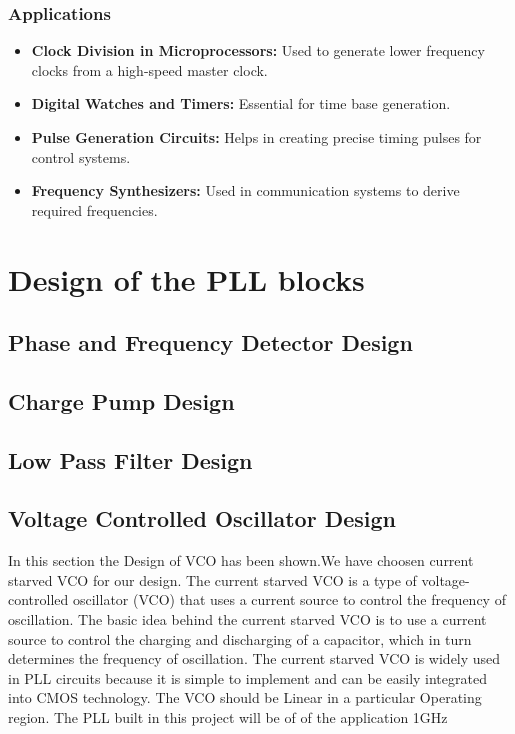\subsubsection*{Applications}
\begin{itemize}
    \item \textbf{Clock Division in Microprocessors:} Used to generate lower frequency clocks from a high-speed master clock.
    \item \textbf{Digital Watches and Timers:} Essential for time base generation.
    \item \textbf{Pulse Generation Circuits:} Helps in creating precise timing pulses for control systems.
    \item \textbf{Frequency Synthesizers:} Used in communication systems to derive required frequencies.
\end{itemize}
\section{Design of the PLL blocks}
\subsection{Phase and Frequency Detector Design}
\subsection{Charge Pump Design}
\subsection{Low Pass Filter Design}
\subsection{Voltage Controlled Oscillator Design}
In this section the Design of VCO has been shown.We have choosen current starved VCO for our design. The current starved VCO is a type of voltage-controlled oscillator (VCO) that uses a current source to control the frequency of oscillation. The basic idea behind the current starved VCO is to use a current source to control the charging and discharging of a capacitor, which in turn determines the frequency of oscillation. The current starved VCO is widely used in PLL circuits because it is simple to implement and can be easily integrated into CMOS technology.
The VCO should be Linear in a particular Operating region. The PLL built in this project will be of of the application 1GHz


